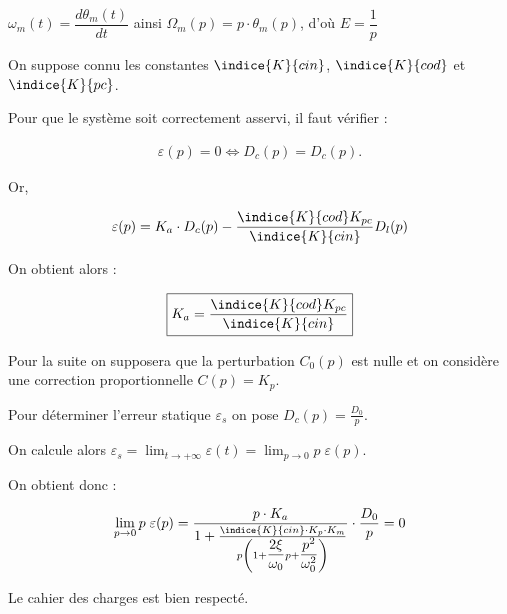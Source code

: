 \ifprof
\begin{corrige}
$\omega_m(t)=\dfrac{d\theta_m(t)}{dt}$ ainsi $\Omega_m(p)=p\cdot \theta_m(p)$, d'où $E=\dfrac{1}{p}$
\end{corrige}
\else
\fi

On suppose connu les constantes $\indice{K}{cin}$, $\indice{K}{cod}$ et $\indice{K}{pc}$.

\ifprof
\begin{corrige}
Pour que le système soit correctement asservi, il faut vérifier : 

\begin{align*}
\varepsilon(p)=0\Leftrightarrow D_c(p)=D_c(p).
\end{align*}

Or,

\begin{align*}
\varepsilon(p)=K_a\cdot D_c(p)-\dfrac{\indice{K}{cod}K_{pc}}{\indice{K}{cin}}D_l(p)
\end{align*}

On obtient alors : 

\begin{align*}
\boxed{
K_a=\dfrac{\indice{K}{cod}K_{pc}}{\indice{K}{cin}}
}
\end{align*}
\end{corrige}
\else
\fi

Pour la suite on supposera que la perturbation $C_0(p)$ est nulle et on considère une correction proportionnelle $C(p)=K_p$.

\ifprof
\begin{corrige}

\end{corrige}
\else
\fi

\ifprof
\begin{corrige}
Pour déterminer l'erreur statique $\varepsilon_s$ on pose $D_c(p)=\frac{D_0}{p}$.

On calcule alors $\varepsilon_s=\lim_{t\rightarrow+\infty} \varepsilon(t) = \lim_{p\rightarrow0} p\;\varepsilon(p).$

On obtient donc : 

\begin{align*}
\lim_{p\rightarrow0} p\;\varepsilon(p)=\dfrac{p\cdot K_a}{1+\frac{\indice{K}{cin}\cdot K_p\cdot K_m}{p\left(1+\dfrac{2\xi}{\omega_0}p+\dfrac{p^2}{\omega_0^2}\right)}}\cdot\frac{D_0}{p}=0
\end{align*}

Le cahier des charges est bien respecté.
\end{corrige}
\else
\fi

